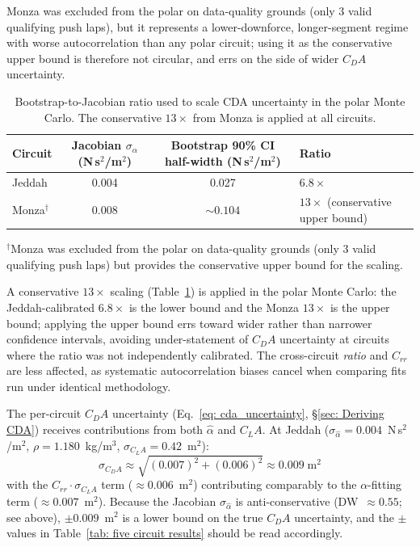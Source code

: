 Monza was excluded from the polar on data-quality grounds (only 3 valid qualifying push laps), but it represents a lower-downforce, longer-segment regime with worse autocorrelation than any polar circuit; using it as the conservative upper bound is therefore not circular, and errs on the side of wider $C_DA$ uncertainty. \begin{table}[h]
\centering
\caption{Bootstrap-to-Jacobian ratio used to scale CDA uncertainty in the polar Monte Carlo. The conservative $13\times$ from Monza is applied at all circuits.}
\label{tab: bootstrap scaling}
\begin{tabularx}{\linewidth}{l c c l}
\toprule
Circuit & {Jacobian $\sigma_\alpha$ (N\,s$^2$/m$^2$)} & {Bootstrap 90\% CI half-width (N\,s$^2$/m$^2$)} & Ratio \\
\midrule
Jeddah   & 0.004 & 0.027 & $6.8\times$ \\
Monza$^\dagger$ & 0.008 & $\sim\!0.104$ & $13\times$ (conservative upper bound) \\
\bottomrule
\end{tabularx}
\footnotesize{$^\dagger$Monza was excluded from the polar on data-quality grounds (only 3 valid qualifying push laps) but provides the conservative upper bound for the scaling.}
\end{table}

A conservative $13\times$ scaling (Table~\ref{tab: bootstrap scaling}) is applied in the polar Monte Carlo: the Jeddah-calibrated $6.8\times$ is the lower bound and the Monza $13\times$ is the upper bound; applying the upper bound errs toward wider rather than narrower confidence intervals, avoiding under-statement of $C_DA$ uncertainty at circuits where the ratio was not independently calibrated. The cross-circuit \emph{ratio} and $C_{rr}$ are less affected, as systematic autocorrelation biases cancel when comparing fits run under identical methodology.

The per-circuit $C_DA$ uncertainty (Eq.~\ref{eq: cda_uncertainty}, \S\ref{sec: Deriving CDA}) receives contributions from both $\hat\alpha$ and $C_LA$. At Jeddah ($\sigma_{\hat\alpha} = 0.004$~N\,s$^2$/m$^2$, $\rho = 1.180$~kg/m$^3$, $\sigma_{C_LA} = 0.42$~m$^2$):
\begin{equation}
    \sigma_{C_DA} \approx \sqrt{(0.007)^2 + (0.006)^2} \approx 0.009\;\text{m}^2
\end{equation}
with the $C_{rr}\cdot\sigma_{C_LA}$ term ($\approx 0.006$~m$^2$) contributing comparably to the $\alpha$-fitting term ($\approx 0.007$~m$^2$). Because the Jacobian $\sigma_{\hat\alpha}$ is anti-conservative (DW~$\approx 0.55$; see above), $\pm 0.009$~m$^2$ is a lower bound on the true $C_DA$ uncertainty, and the $\pm$ values in Table~\ref{tab: five circuit results} should be read accordingly.

